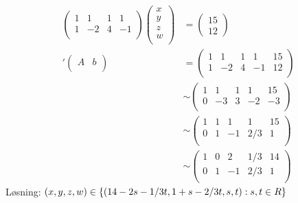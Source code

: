   \begin{align*}
    \begin{pmatrix}
      1 & 1 & 1 & 1 \\
      1 & -2 & 4 & -1 \\
    \end{pmatrix}
    \begin{pmatrix}
      x\\
      y\\
      z\\
      w\\
    \end{pmatrix}
        &=
          \begin{pmatrix}
            15\\
            12
          \end{pmatrix}\\
'      \begin{pmatrix}
        A & b \\
      \end{pmatrix}
    &= 
    \begin{pmatrix}
      1 & 1 & 1 & 1 &15\\
      1 & -2 & 4 & -1 &12\\
    \end{pmatrix}
    \\
&\sim
  \begin{pmatrix}
    1 & 1 & 1 & 1 &15\\
    0 & -3 & 3 & -2 &-3\\
  \end{pmatrix}\\
&\sim
  \begin{pmatrix}
    1 & 1 & 1 & 1 &15\\
    0 & 1 & -1 & 2/3 &1\\
  \end{pmatrix}\\
    &\sim
  \begin{pmatrix}
    1 & 0 & 2 & 1/3 &14\\
    0 & 1 & -1 & 2/3 &1\\
  \end{pmatrix}
  \end{align*}
  Løsning: $(x,y,z,w) \in \left\{ (14-2s-1/3t, 1+s-2/3t, s, t) : s, t \in R \right \}$
